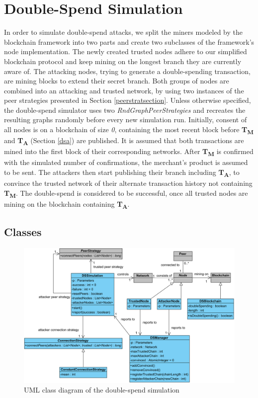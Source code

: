 \documentclass[a4paper,12pt,twoside]{report}
\begin{document}
\section{Double-Spend Simulation}
In order to simulate double-spend attacks, we split the miners modeled by the blockchain framework into two parts and create two subclasses of the framework's node implementation. The newly created trusted nodes adhere to our simplified blockchain protocol and keep mining on the longest branch they are currently aware of. The attacking nodes, trying to generate a double-spending transaction, are mining blocks to extend their secret branch. Both groups of nodes are combined into an attacking and trusted network, by using two instances of the peer strategies presented in Section \ref{peerstratsection}. Unless otherwise specified, the double-spend simulator uses two \textit{RndGraphPeerStrategies} and recreates the resulting graphs randomly before every new simulation run. Initially, consent of all nodes is on a blockchain of size \textit{0}, containing the most recent block before \textbf{T\textsubscript{M}} and \textbf{T\textsubscript{A}} (Section \ref{dsa}) are published. It is assumed that both transactions are mined into the first block of their corresponding networks. After \textbf{T\textsubscript{M}} is confirmed with the simulated number of confirmations, the merchant's product is assumed to be sent. The attackers then start publishing their branch including \textbf{T\textsubscript{A}}, to convince the trusted network of their alternate transaction history not containing \textbf{T\textsubscript{M}}. The double-spend is considered to be successful, once all trusted nodes are mining on the blockchain containing \textbf{T\textsubscript{A}}.
\subsection{Classes}
\begin{figure}
	\centering
  \includegraphics[width=\textwidth]{Simulation.png}
	\caption{UML class diagram of the double-spend simulation}
	\label{simulation}
\end{figure}
\end{document}
